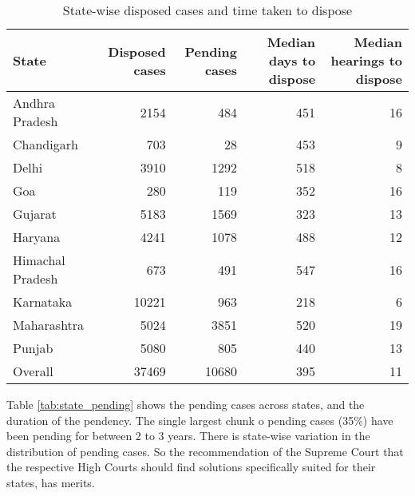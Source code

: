 \begin{longtable}{@{}lrrrr@{}}
  \caption{State-wise disposed cases and time taken to dispose}\label{tab:state_disposal}\\
\toprule
\textbf{State} &  \multicolumn{1}{p{3cm}}{\textbf{Disposed cases}} &  \multicolumn{1}{p{3cm}}{\textbf{Pending cases}} &  \multicolumn{1}{p{3cm}}{\textbf{Median days to dispose}} &  \multicolumn{1}{p{3cm}}{\textbf{Median hearings to dispose}} \\
\midrule
Andhra Pradesh   &      2154 &      484 &                     451 &                  16 \\
Chandigarh       &       703 &       28 &                     453 &                   9 \\
Delhi            &      3910 &     1292 &                     518 &                   8 \\
Goa              &       280 &      119 &                     352 &                  16 \\
Gujarat          &      5183 &     1569 &                     323 &                  13 \\
Haryana          &      4241 &     1078 &                     488 &                  12 \\
Himachal Pradesh &       673 &      491 &                     547 &                  16 \\
Karnataka        &     10221 &      963 &                     218 &                   6 \\
Maharashtra      &      5024 &     3851 &                     520 &                  19 \\
Punjab           &      5080 &      805 &                     440 &                  13 \\
\midrule
Overall & 37469 & 10680 & 395 & 11 \\
\bottomrule
\end{longtable}

Table \ref{tab:state_pending} shows the pending cases across states, and the duration of the pendency. The single largest chunk o pending cases (35\%) have been pending for between 2 to 3 years. There is state-wise variation in the distribution of pending cases. So the recommendation of the Supreme Court that the respective High Courts should find solutions specifically suited for their states, has merits.

